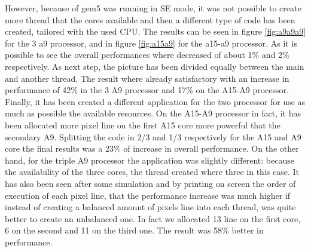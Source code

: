 \documentclass[journal]{IEEEtran}
\begin{document}
However, because of gem5 was running in SE mode, it was not possible to create more thread that the cores available and then a different type of code has been created, tailored with the used CPU.
The results can be seen in figure \ref{fig:a9a9a9} for the 3 a9 processor, and in figure \ref{fig:a15a9} for the a15-a9 processor. As it is possible to see the overall performances where decreased of about 1\% and 2\% respectively.
As next step, the picture has been divided equally between the main and another thread. The result where already satisfactory with an increase in performance of 42\% in the 3 A9 processor and 17\% on the A15-A9 processor.
Finally, it has been created a different application for the two processor for use as much as possible the available resources. On the A15-A9 processor in fact, it has been allocated more pixel line on the first A15 core more powerful that the secondary A9. Splitting the code in 2/3 and 1/3 respectively for the A15 and A9 core the final results was a 23\% of increase in overall performance.
On the other hand, for the triple A9 processor the application was slightly different: because the availability of the three cores, the thread created where three in this case. It has also been seen after some simulation and by printing on screen the order of execution of each pixel line, that the performance increase was much higher if instead of creating a balanced amount of pixels line into each thread, was quite better to create an unbalanced one. In fact we allocated 13 line on the first core, 6 on the second and 11 on the third one. The result was 58\% better in performance.
\end{document}
